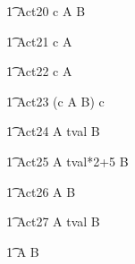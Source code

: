 \begin{circusaction}
	\t1 Act20 \circdef c \then  A \circtimeout {} \rcirctime B \\
\end{circusaction}

\begin{circusaction}
	\t1 Act21 \circdef c \then  A \circtimeout {} \rcirctime \Skip \\
\end{circusaction}

\begin{circusaction}
	\t1 Act22 \circdef c \then  A \circtimeout {} \rcirctime \Stop \\
\end{circusaction}

\begin{circusaction}
	\t1 Act23 \circdef (c \then A \circtimeout {} \rcirctime B) \circhide c \\
\end{circusaction}

\begin{circusaction}
	\t1 Act24 \circdef A \circtimeout \lcirctime tval \rcirctime B \\
\end{circusaction}

\begin{circusaction}
	\t1 Act25 \circdef A \circtimeout \lcirctime tval*2+5 \rcirctime B \\
\end{circusaction}
 

\begin{circusaction}
    	\t1 Act26 \circdef A \circtimeout {}  \rcirctime B \\
\end{circusaction}

\begin{circusaction}
    	\t1 Act27 \circdef A \circtimeout {} \upto tval \rcirctime B \\
\end{circusaction}


\begin{circusaction}
        \t1 \circspot A \circseq B\\
\end{circusaction}

\begin{circus}
    \circend
\end{circus}

